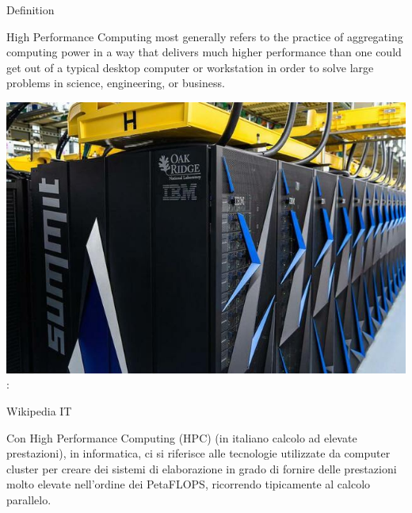 \documentclass[ignorenonframetext,]{beamer}
\providecommand{\tightlist}{%
  \setlength{\itemsep}{0pt}\setlength{\parskip}{0pt}}
\begin{document}
\begin{frame}{Definition}

\begin{description}
\tightlist
\item[\href{https://insidehpc.com/hpc-basic-training/what-is-hpc/}{HPC}]
High Performance Computing most generally refers to the practice of
aggregating computing power in a way that delivers much higher
performance than one could get out of a typical desktop computer or
workstation in order to solve large problems in science, engineering, or
business.
\end{description}

\includegraphics{images/Summit_small.jpg} :

\end{frame}

\begin{frame}{Wikipedia IT}

\begin{description}
\tightlist
\item[\href{https://it.wikipedia.org/wiki/High_Performance_Computing}{HPC}]
Con High Performance Computing (HPC) (in italiano calcolo ad elevate
prestazioni), in informatica, ci si riferisce alle tecnologie utilizzate
da computer cluster per creare dei sistemi di elaborazione in grado di
fornire delle prestazioni molto elevate nell'ordine dei PetaFLOPS,
ricorrendo tipicamente al calcolo parallelo.
\end{description}


\end{frame}
\end{document}

